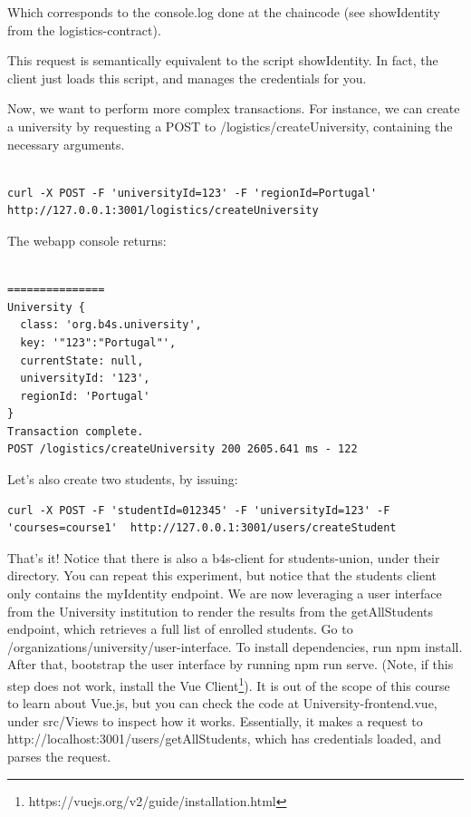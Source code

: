 \documentclass[12pt,a4paper]{article}
\theoremstyle{definition}
\begin{document}
Which corresponds to the console.log done at the chaincode (see showIdentity from the logistics-contract).

This request is semantically equivalent to the script showIdentity. In fact, the client just loads this script, and manages the credentials for you.  



Now, we want to perform more complex transactions. For instance, we can create a university by requesting a POST to /logistics/createUniversity, containing the necessary arguments. 
\begin{verbatim}

curl -X POST -F 'universityId=123' -F 'regionId=Portugal' http://127.0.0.1:3001/logistics/createUniversity
\end{verbatim}

The webapp console returns:

\begin{verbatim}

===============
University {
  class: 'org.b4s.university',
  key: '"123":"Portugal"',
  currentState: null,
  universityId: '123',
  regionId: 'Portugal'
}
Transaction complete.
POST /logistics/createUniversity 200 2605.641 ms - 122

\end{verbatim}

Let's also create two students, by issuing:
\begin{verbatim}
curl -X POST -F 'studentId=012345' -F 'universityId=123' -F 'courses=course1'  http://127.0.0.1:3001/users/createStudent
\end{verbatim}



That's it! Notice that there is also a b4s-client for students-union, under their directory. You can repeat this experiment, but notice that the students client only contains the myIdentity endpoint. We are now leveraging a user interface from the University institution to render the results from the getAllStudents endpoint, which retrieves a full list of enrolled students. Go to /organizations/university/user-interface. To install dependencies, run npm install. After that, bootstrap the user interface by running npm run serve. (Note, if this step does not work, install the Vue Client\footnote{https://vuejs.org/v2/guide/installation.html}). It is out of the scope of this course to learn about Vue.js, but you can check the code at University-frontend.vue, under src/Views to inspect how it works. Essentially, it makes a request to http://localhost:3001/users/getAllStudents, which has credentials loaded, and parses the request.
\end{document}
